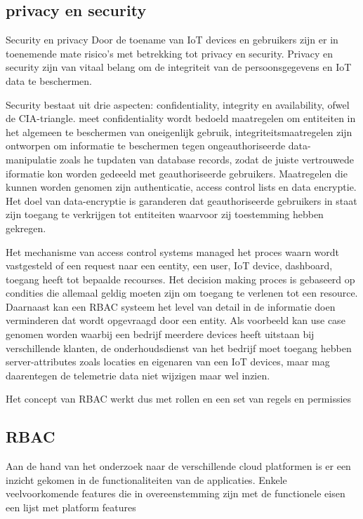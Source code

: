 \subsection{privacy en security}

Security en privacy
Door de toename van IoT devices en gebruikers zijn er in toenemende mate risico's met betrekking tot privacy en security. Privacy en security zijn van vitaal belang om de integriteit van de persoonsgegevens en IoT data  te beschermen.

Security bestaat uit drie aspecten: confidentiality, integrity en availability, ofwel de CIA-triangle. meet confidentiality wordt bedoeld maatregelen om entiteiten in het algemeen te beschermen van oneigenlijk gebruik, integriteitsmaatregelen  zijn ontworpen om informatie te beschermen tegen ongeauthoriseerde data-manipulatie zoals he tupdaten van database records, zodat de juiste vertrouwede iformatie  kon worden gedeeeld met geauthoriseerde gebruikers. Maatregelen die kunnen worden genomen zijn authenticatie, access control lists en data encryptie. Het doel van data-encryptie is garanderen dat geauthoriseerde gebruikers in staat zijn toegang te verkrijgen tot entiteiten waarvoor zij toestemming hebben gekregen.

Het mechanisme van access control systems managed het proces waarn wordt vastgesteld of een request naar een eentity, een user, IoT device, dashboard, toegang heeft tot bepaalde recourses. Het decision making proces is gebaseerd op condities die allemaal geldig moeten zijn om toegang te verlenen tot een resource. Daarnaast kan een RBAC systeem  het level van detail in de informatie doen verminderen dat wordt opgevraagd door een entity. Als voorbeeld kan use case genomen worden waarbij een bedrijf meerdere devices heeft uitstaan bij verschillende klanten, de onderhoudsdienst van het bedrijf moet toegang hebben  server-attributes zoals locaties en eigenaren van een IoT devices, maar mag daarentegen de telemetrie data niet wijzigen maar wel inzien.

Het concept van RBAC werkt dus met rollen en een set van regels en permissies




\subsection{RBAC}
Aan de hand van het onderzoek naar de verschillende cloud platformen is er een inzicht gekomen in de functionaliteiten van de applicaties. Enkele veelvoorkomende features die in overeenstemming zijn met de functionele eisen een lijst met platform features

